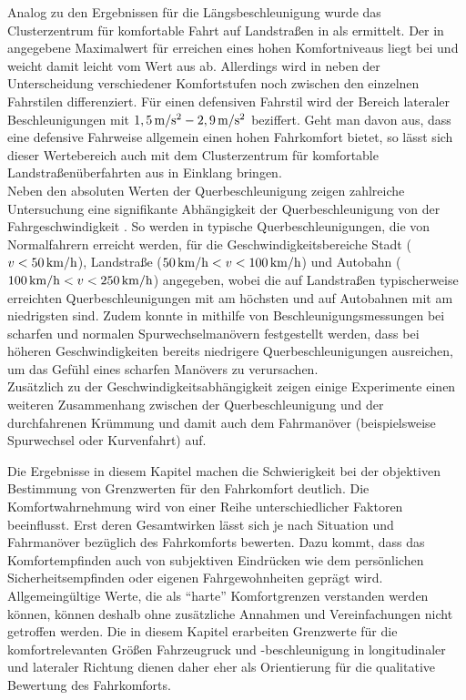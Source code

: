 Analog zu den Ergebnissen für die Längsbeschleunigung wurde das Clusterzentrum für komfortable Fahrt auf Landstraßen in \cite{radke} als  ermittelt. Der in \cite{Schwab} angegebene Maximalwert für erreichen eines hohen Komfortniveaus liegt bei  und weicht damit leicht vom Wert aus \cite{radke} ab. Allerdings wird in \cite{Schwab} neben der Unterscheidung verschiedener Komfortstufen noch zwischen den einzelnen Fahrstilen differenziert. Für einen defensiven Fahrstil wird der Bereich lateraler Beschleunigungen mit $1,5\,\mathrm{m/s^2}-2,9\,\mathrm{m/s^2}$ beziffert. Geht man davon aus, dass eine defensive Fahrweise allgemein einen hohen Fahrkomfort bietet, so lässt sich dieser Wertebereich auch mit dem Clusterzentrum für komfortable Landstraßenüberfahrten aus \cite{radke} in Einklang bringen. \\
Neben den absoluten Werten der Querbeschleunigung zeigen zahlreiche Untersuchung eine signifikante Abhängigkeit der Querbeschleunigung von der Fahrgeschwindigkeit \cite{schimmelpfennig_nackenhorst}\cite{dragon}\cite{reymond_kemeny}. So werden in \cite{dragon} typische Querbeschleunigungen, die von Normalfahrern erreicht werden, für die Geschwindigkeitsbereiche Stadt ($v<50\,\mathrm{km/h}$), Landstraße ($50\,\mathrm{km/h}<v<100\,\mathrm{km/h}$) und Autobahn ($100\,\mathrm{km/h}<v<250\,\mathrm{km/h}$) angegeben, wobei die auf Landstraßen typischerweise erreichten Querbeschleunigungen mit  am höchsten und auf Autobahnen mit  am niedrigsten sind.
Zudem konnte in \cite{schimmelpfennig_nackenhorst} mithilfe von Beschleunigungsmessungen bei scharfen und normalen Spurwechselmanövern festgestellt werden, dass bei höheren Geschwindigkeiten bereits niedrigere Querbeschleunigungen ausreichen, um das Gefühl eines scharfen Manövers zu verursachen. \\
Zusätzlich zu der Geschwindigkeitsabhängigkeit zeigen einige Experimente einen weiteren Zusammenhang zwischen der Querbeschleunigung und der durchfahrenen Krümmung und damit auch dem Fahrmanöver (beispielsweise Spurwechsel oder Kurvenfahrt) auf.




Die Ergebnisse in diesem Kapitel machen die Schwierigkeit bei der objektiven Bestimmung von Grenzwerten für den Fahrkomfort deutlich. Die Komfortwahrnehmung wird von einer Reihe unterschiedlicher Faktoren beeinflusst. Erst deren Gesamtwirken lässt sich je nach Situation und Fahrmanöver bezüglich des Fahrkomforts bewerten. Dazu kommt, dass das Komfortempfinden auch von subjektiven Eindrücken wie dem persönlichen Sicherheitsempfinden oder eigenen Fahrgewohnheiten geprägt wird. Allgemeingültige Werte, die als ``harte'' Komfortgrenzen verstanden werden können, können deshalb ohne zusätzliche Annahmen und Vereinfachungen nicht getroffen werden. Die in diesem Kapitel erarbeiten Grenzwerte für die komfortrelevanten Größen Fahrzeugruck und -beschleunigung in longitudinaler und lateraler Richtung dienen daher eher als Orientierung für die qualitative Bewertung des Fahrkomforts.
